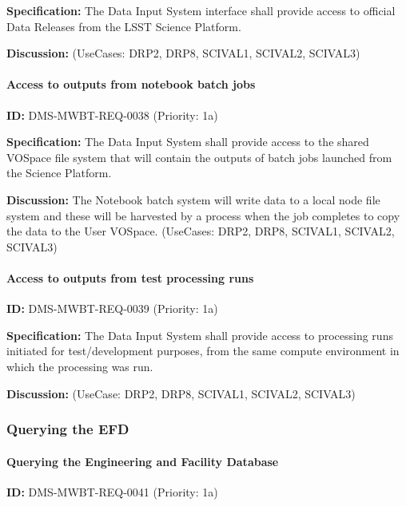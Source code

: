 \documentclass[SE,toc,lsstdraft]{lsstdoc}
\begin{document}
\textbf{Specification:}
The Data Input System interface shall provide access to official Data Releases from the LSST Science Platform.

\textbf{Discussion:}
(UseCases: DRP2, DRP8, SCIVAL1, SCIVAL2, SCIVAL3)

\paragraph{Access to outputs from notebook batch jobs}\hfill  %

\label{DMS-MWBT-REQ-0038}
\textbf{ID:} DMS-MWBT-REQ-0038 (Priority: 1a)

\textbf{Specification:}
The Data Input System shall provide access to the shared VOSpace file system that will contain the outputs of batch jobs launched from the Science Platform.

\textbf{Discussion:}
The Notebook batch system will write data to a local node file system and these will be harvested by a process when the job completes to copy the data to the User VOSpace. (UseCases: DRP2, DRP8, SCIVAL1, SCIVAL2, SCIVAL3)

\paragraph{Access to outputs from test processing runs}\hfill  %

\label{DMS-MWBT-REQ-0039}
\textbf{ID:} DMS-MWBT-REQ-0039 (Priority: 1a)

\textbf{Specification:}
The Data Input System shall provide access to processing runs initiated for test/development purposes, from the same compute environment in which the processing was run.

\textbf{Discussion:}
(UseCase: DRP2, DRP8, SCIVAL1, SCIVAL2, SCIVAL3)

\subsubsection{Querying the EFD}

\paragraph{Querying the Engineering and Facility Database}\hfill  %

\label{DMS-MWBT-REQ-0041}
\textbf{ID:} DMS-MWBT-REQ-0041 (Priority: 1a)
\end{document}
